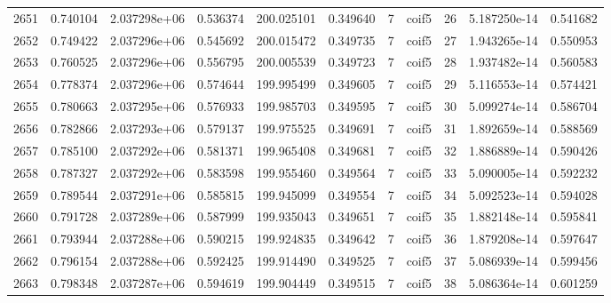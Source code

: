 \begin{tabular}{lrrrrrrlrrr}
2651 &    0.740104 &        2.037298e+06 &  0.536374 &              200.025101 &    0.349640 &       7 &        coif5 &     26 &   5.187250e-14 &      0.541682 \\
2652 &    0.749422 &        2.037296e+06 &  0.545692 &              200.015472 &    0.349735 &       7 &        coif5 &     27 &   1.943265e-14 &      0.550953 \\
2653 &    0.760525 &        2.037296e+06 &  0.556795 &              200.005539 &    0.349723 &       7 &        coif5 &     28 &   1.937482e-14 &      0.560583 \\
2654 &    0.778374 &        2.037296e+06 &  0.574644 &              199.995499 &    0.349605 &       7 &        coif5 &     29 &   5.116553e-14 &      0.574421 \\
2655 &    0.780663 &        2.037295e+06 &  0.576933 &              199.985703 &    0.349595 &       7 &        coif5 &     30 &   5.099274e-14 &      0.586704 \\
2656 &    0.782866 &        2.037293e+06 &  0.579137 &              199.975525 &    0.349691 &       7 &        coif5 &     31 &   1.892659e-14 &      0.588569 \\
2657 &    0.785100 &        2.037292e+06 &  0.581371 &              199.965408 &    0.349681 &       7 &        coif5 &     32 &   1.886889e-14 &      0.590426 \\
2658 &    0.787327 &        2.037292e+06 &  0.583598 &              199.955460 &    0.349564 &       7 &        coif5 &     33 &   5.090005e-14 &      0.592232 \\
2659 &    0.789544 &        2.037291e+06 &  0.585815 &              199.945099 &    0.349554 &       7 &        coif5 &     34 &   5.092523e-14 &      0.594028 \\
2660 &    0.791728 &        2.037289e+06 &  0.587999 &              199.935043 &    0.349651 &       7 &        coif5 &     35 &   1.882148e-14 &      0.595841 \\
2661 &    0.793944 &        2.037288e+06 &  0.590215 &              199.924835 &    0.349642 &       7 &        coif5 &     36 &   1.879208e-14 &      0.597647 \\
2662 &    0.796154 &        2.037288e+06 &  0.592425 &              199.914490 &    0.349525 &       7 &        coif5 &     37 &   5.086939e-14 &      0.599456 \\
2663 &    0.798348 &        2.037287e+06 &  0.594619 &              199.904449 &    0.349515 &       7 &        coif5 &     38 &   5.086364e-14 &      0.601259 \\

\end{tabular}
